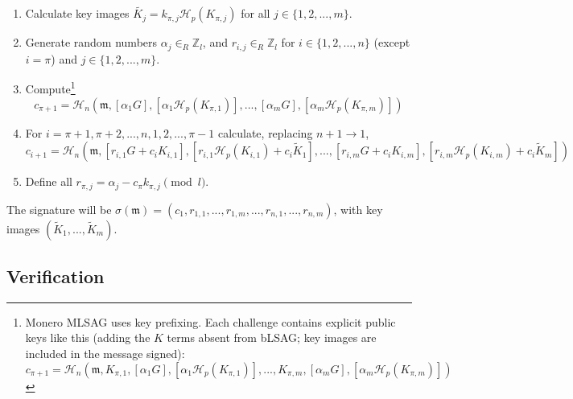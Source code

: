 \begin{enumerate}
	\item Calculate key images \(\tilde{K_j} = k_{\pi, j} \mathcal{H}_p(K_{\pi, j})\) for all \(j \in \{1, 2, ..., m\}\).

	\item Generate random numbers  \(\alpha_j \in_R \mathbb{Z}_l\), and \(r_{i, j} \in_R \mathbb{Z}_l\) for \(i \in \{1, 2, ..., n\}\) (except \(i = \pi\)) and \(j \in \{1, 2, ..., m\}\).

	\item Compute\footnote{Monero MLSAG uses key prefixing. Each challenge contains explicit public keys like this (adding the $K$ terms absent from bLSAG; key images are included in the message signed):\vspace{-.25cm}
	\[c_{\pi+1} = \mathcal{H}_n(\mathfrak{m}, K_{\pi, 1}, [\alpha_1 G], [\alpha_1 \mathcal{H}_p(K_{\pi, 1})], ..., K_{\pi, m}, [\alpha_m G], [\alpha_m \mathcal{H}_p(K_{\pi, m})])
	\]}
	\[c_{\pi+1} = \mathcal{H}_n(\mathfrak{m}, [\alpha_1 G], [\alpha_1 \mathcal{H}_p(K_{\pi, 1})], ..., [\alpha_m G], [\alpha_m \mathcal{H}_p(K_{\pi, m})])\]

	\item For \(i = \pi+1, \pi+2, ..., n, 1, 2, ..., \pi-1\) calculate, replacing \(n + 1 \rightarrow 1\),\vspace{.175cm}
	\[ c_{i+1} = \mathcal{H}_n(\mathfrak{m}, [r_{i, 1} G + c_i K_{i, 1}], [r_{i, 1} \mathcal{H}_p(K_{i, 1}) + c_i \tilde{K}_1], 
	..., [r_{i, m} G + c_i K_{i, m}], [r_{i, m} \mathcal{H}_p(K_{i, m}) + c_i \tilde{K}_m])\]

	\item Define all \(r_{\pi, j} = \alpha_j - c_\pi k_{\pi, j} \pmod l\).
\end{enumerate}

The signature will be \(\sigma(\mathfrak{m}) = (c_1, r_{1, 1}, ..., r_{1, m}, ..., r_{n, 1}, ..., r_{n, m}) \), with key images $(\tilde{K}_1, ...,  \tilde{K}_m)$.



\subsection*{Verification}

